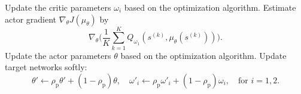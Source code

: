 \documentclass[11pt]{article}
\begin{document}
\begin{algorithmic}
\begin{equation*}
\end{equation*}
\State Update the critic parameters $\omega_i$ based on the optimization algorithm.
\State Estimate actor gradient $\nabla_\theta J(\mu_\theta)$ by
\begin{equation*}
\nabla_{\theta} \Biggl(\frac{1}{K} \sum\limits_{k=1}^K Q_{\omega_1}(s^{(k)}, \mu_\theta(s^{(k)})) \Biggr).
\end{equation*}
\State Update the actor parameters $\theta$ based on the optimization algorithm.
\State Update target networks softly:
\begin{equation*}
\theta' \leftarrow \rho_\text{p} \theta' + (1 - \rho_\text{p})\theta, \quad
{\omega'}_i \leftarrow \rho_\text{p} {\omega'}_i + (1 - \rho_\text{p})\omega_i, \quad \text{for} \, \, i=1, 2.
\end{equation*}
\EndIf
\EndFor
{}
\end{algorithmic}
\end{document}
